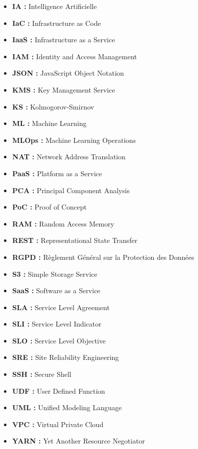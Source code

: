 \begin{itemize}
    \item[$\bullet$] \textbf{IA :} Intelligence Artificielle
    \item[$\bullet$] \textbf{IaC :} Infrastructure as Code
    \item[$\bullet$] \textbf{IaaS :} Infrastructure as a Service
    \item[$\bullet$] \textbf{IAM :} Identity and Access Management
    \item[$\bullet$] \textbf{JSON :} JavaScript Object Notation
    \item[$\bullet$] \textbf{KMS :} Key Management Service
    \item[$\bullet$] \textbf{KS :} Kolmogorov-Smirnov
    \item[$\bullet$] \textbf{ML :} Machine Learning
    \item[$\bullet$] \textbf{MLOps :} Machine Learning Operations
    \item[$\bullet$] \textbf{NAT :} Network Address Translation
    \item[$\bullet$] \textbf{PaaS :} Platform as a Service
    \item[$\bullet$] \textbf{PCA :} Principal Component Analysis
    \item[$\bullet$] \textbf{PoC :} Proof of Concept
    \item[$\bullet$] \textbf{RAM :} Random Access Memory
    \item[$\bullet$] \textbf{REST :} Representational State Transfer
    \item[$\bullet$] \textbf{RGPD :} Règlement Général sur la Protection des Données
    \item[$\bullet$] \textbf{S3 :} Simple Storage Service
    \item[$\bullet$] \textbf{SaaS :} Software as a Service
    \item[$\bullet$] \textbf{SLA :} Service Level Agreement
    \item[$\bullet$] \textbf{SLI :} Service Level Indicator
    \item[$\bullet$] \textbf{SLO :} Service Level Objective
    \item[$\bullet$] \textbf{SRE :} Site Reliability Engineering
    \item[$\bullet$] \textbf{SSH :} Secure Shell
    \item[$\bullet$] \textbf{UDF :} User Defined Function
    \item[$\bullet$] \textbf{UML :} Unified Modeling Language
    \item[$\bullet$] \textbf{VPC :} Virtual Private Cloud
    \item[$\bullet$] \textbf{YARN :} Yet Another Resource Negotiator
\end{itemize}

\clearpage